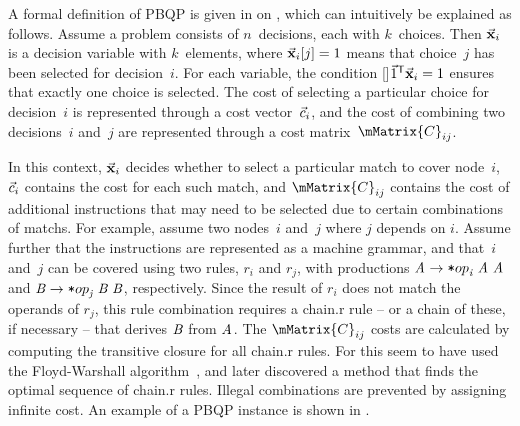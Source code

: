 A formal definition of \gls{PBQP} is given in
 on ,
which can intuitively be explained as follows.
%
Assume a problem consists of $n$~decisions, each with $k$~choices.
%
Then $\mVector{\mVar{x}}_i$ is a \gls{decision variable} with $k$~elements,
where \mbox{$\mVector{\mVar{x}}_i[j] = 1$} means that choice~$j$ has been
selected for decision~$i$.
%
For each \gls{variable}, the condition
\raisebox{0pt}[\height-2pt]{$\mVector{1}^{\transp} \mVector{\mVar{x}}_i = 1$}
ensures that exactly one choice is selected.
%
The cost of selecting a particular choice for decision~$i$ is represented
through a cost vector~$\vec{c}_i$, and the cost of combining two
decisions~$i$ and~$j$ are represented through a cost matrix~$\mMatrix{C}_{ij}$.

In this context, $\mVector{\mVar{x}}_i$ decides whether to select a particular
\gls{match} to cover \gls{node}~$i$, $\vec{c}_i$ contains the cost for each
such \gls{match}, and $\mMatrix{C}_{ij}$ contains the cost of additional
\glspl{instruction} that may need to be selected due to certain combinations of
\glspl{match}.
%
For example, assume two nodes~$i$ and~$j$ where $j$ depends on $i$.
%
Assume further that the \glspl{instruction} are represented as a
 \gls{machine grammar}, and that~$i$ and~$j$ can be
covered using two \glspl{rule}, $r_i$ and $r_j$, with \glspl{production}
\mbox{$\mNT{A} \rightarrow \irCode*{op}_{\mathit{i}} \; \mNT{A} \; \mNT{A}$} and
\mbox{$\mNT{B} \rightarrow \irCode*{op}_{\mathit{j}} \; \mNT{B} \; \mNT{B}$},
respectively.
%
Since the result of $r_i$ does not match the operands of $r_j$, this \gls{rule}
combination requires a \gls{chain.r} \gls{rule} -- or a chain of these, if
necessary -- that derives $\mNT{B}$ from $\mNT{A}$.
%
The $\mMatrix{C}_{ij}$ costs are calculated by computing the \gls{transitive
  closure} for all \gls{chain.r} \glspl{rule}.
%
For this \citeauthor{EcksteinEtAl:2003} seem to have used the Floyd-Warshall
algorithm~\cite{Floyd:1962}, and \textcite{SchaeferScholz:2007} later discovered
a method that finds the optimal sequence of \gls{chain.r} \glspl{rule}.
%
Illegal combinations are prevented by assigning infinite cost.
%
An example of a \gls{PBQP} instance is shown in .

